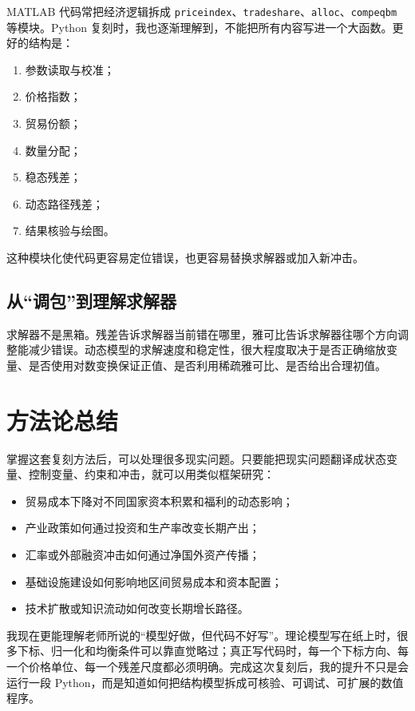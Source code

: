 \documentclass[UTF8,12pt,a4paper]{ctexart}
\begin{document}
MATLAB 代码常把经济逻辑拆成 \texttt{priceindex}、\texttt{tradeshare}、\texttt{alloc}、\texttt{compeqbm} 等模块。Python 复刻时，我也逐渐理解到，不能把所有内容写进一个大函数。更好的结构是：
\begin{enumerate}
  \item 参数读取与校准；
  \item 价格指数；
  \item 贸易份额；
  \item 数量分配；
  \item 稳态残差；
  \item 动态路径残差；
  \item 结果核验与绘图。
\end{enumerate}
这种模块化使代码更容易定位错误，也更容易替换求解器或加入新冲击。

\subsection{从“调包”到理解求解器}

求解器不是黑箱。残差告诉求解器当前错在哪里，雅可比告诉求解器往哪个方向调整能减少错误。动态模型的求解速度和稳定性，很大程度取决于是否正确缩放变量、是否使用对数变换保证正值、是否利用稀疏雅可比、是否给出合理初值。

\section{方法论总结}

掌握这套复刻方法后，可以处理很多现实问题。只要能把现实问题翻译成状态变量、控制变量、约束和冲击，就可以用类似框架研究：
\begin{itemize}
  \item 贸易成本下降对不同国家资本积累和福利的动态影响；
  \item 产业政策如何通过投资和生产率改变长期产出；
  \item 汇率或外部融资冲击如何通过净国外资产传播；
  \item 基础设施建设如何影响地区间贸易成本和资本配置；
  \item 技术扩散或知识流动如何改变长期增长路径。
\end{itemize}

我现在更能理解老师所说的“模型好做，但代码不好写”。理论模型写在纸上时，很多下标、归一化和均衡条件可以靠直觉略过；真正写代码时，每一个下标方向、每一个价格单位、每一个残差尺度都必须明确。完成这次复刻后，我的提升不只是会运行一段 Python，而是知道如何把结构模型拆成可核验、可调试、可扩展的数值程序。
\end{document}
